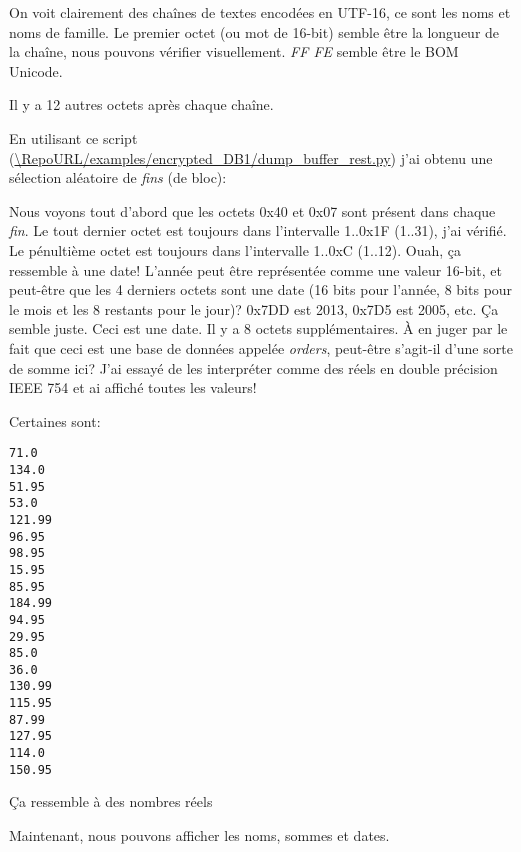 On voit clairement des chaînes de textes encodées en UTF-16, ce sont les noms et
noms de famille.
Le premier octet (ou mot de 16-bit) semble être la longueur de la chaîne, nous pouvons
vérifier visuellement.
\emph{FF FE} semble être le \ac{BOM} Unicode.

Il y a 12 autres octets après chaque chaîne.

En utilisant ce script
(\url{\RepoURL/examples/encrypted_DB1/dump_buffer_rest.py})
j'ai obtenu une sélection aléatoire de \emph{fins} (de bloc):



Nous voyons tout d'abord que les octets 0x40 et 0x07 sont présent dans chaque \emph{fin}.
Le tout dernier octet est toujours dans l'intervalle 1..0x1F (1..31), j'ai vérifié.
Le pénultième octet est toujours dans l'intervalle 1..0xC (1..12).
Ouah, ça ressemble à une date!
L'année peut être représentée comme une valeur 16-bit, et peut-être que les 4 derniers
octets sont une date (16 bits pour l'année, 8 bits pour le mois et les 8 restants
pour le jour)?
0x7DD est 2013, 0x7D5 est 2005, etc. Ça semble juste. Ceci est une date.
Il y a 8 octets supplémentaires.
À en juger par le fait que ceci est une base de données appelée \emph{orders}, peut-être
s'agit-il d'une sorte de somme ici?
J'ai essayé de les interpréter comme des réels en double précision IEEE 754 et ai
affiché toutes les valeurs!

Certaines sont:

\begin{lstlisting}
71.0
134.0
51.95
53.0
121.99
96.95
98.95
15.95
85.95
184.99
94.95
29.95
85.0
36.0
130.99
115.95
87.99
127.95
114.0
150.95
\end{lstlisting}

Ça ressemble à des nombres réels

Maintenant, nous pouvons afficher les noms, sommes et dates.

